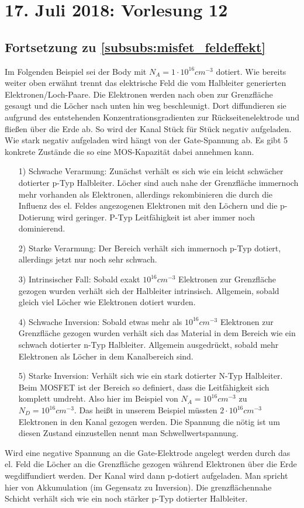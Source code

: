 \documentclass[12pt,a4paper]{report}%
\numberwithin{equation}{section}
\numberwithin{equation}{subsection}
\begin{document}
  \section{17. Juli 2018: Vorlesung 12}
  \subsection{Fortsetzung zu \ref{subsubs:misfet_feldeffekt}}
  Im Folgenden Beispiel sei der Body mit $N_A = 1\cdot 10^{16}cm^{-3}$ dotiert. Wie bereits weiter oben erwähnt trennt das elektrische Feld die vom Halbleiter generierten Elektronen/Loch-Paare. Die Elektronen werden nach oben zur Grenzfläche gesaugt und die Löcher nach unten hin weg beschleunigt. Dort diffundieren sie aufgrund des entstehenden Konzentrationsgradienten zur Rückseitenelektrode und fließen über die Erde ab. So wird der Kanal Stück für Stück negativ aufgeladen. Wie stark negativ aufgeladen wird hängt von der Gate-Spannung ab. Es gibt 5 konkrete Zustände die so eine MOS-Kapazität dabei annehmen kann.
  \begin{itemize}
    \item[1) ] Schwache Verarmung: Zunächst verhält es sich wie ein leicht schwächer dotierter p-Typ Halbleiter. Löcher sind auch nahe der Grenzfläche immernoch mehr vorhanden als Elektronen, allerdings rekombinieren die durch die Influenz des el. Feldes angezogenen Elektronen mit den Löchern und die p-Dotierung wird geringer. P-Typ Leitfähigkeit ist aber immer noch dominierend.
    \item[2) ] Starke Verarmung: Der Bereich verhält sich immernoch p-Typ dotiert, allerdings jetzt nur noch sehr schwach.
    \item[3) ] Intrinsischer Fall: Sobald exakt $10^{16}cm^{-3}$ Elektronen zur Grenzfläche gezogen wurden verhält sich der Halbleiter intrinsisch. Allgemein, sobald gleich viel Löcher wie Elektronen dotiert wurden.
    \item[4) ] Schwache Inversion: Sobald etwas mehr als $10^{16}cm^{-3}$ Elektronen zur Grenzfläche gezogen wurden verhält sich das Material in dem Bereich wie ein schwach dotierter n-Typ Halbleiter. Allgemein ausgedrückt, sobald mehr Elektronen als Löcher in dem Kanalbereich sind.
    \item[5) ] Starke Inversion: Verhält sich wie ein stark dotierter N-Typ Halbleiter. Beim MOSFET ist der Bereich so definiert, dass die Leitfähigkeit sich komplett umdreht. Also hier im Beispiel von $N_A = 10^{16}cm^{-3}$ zu $N_D = 10^{16}cm^{-3}$. Das heißt in unserem Beispiel müssten $2\cdot 10^{16}cm^{-3}$ Elektronen in den Kanal gezogen werden. Die Spannung die nötig ist um diesen Zustand einzustellen nennt man Schwellwertspannung.
  \end{itemize}
  Wird eine negative Spannung an die Gate-Elektrode angelegt werden durch das el. Feld die Löcher an die Grenzfläche gezogen während Elektronen über die Erde wegdiffundiert werden. Der Kanal wird dann p-dotiert aufgeladen. Man spricht hier von Akkumulation (im Gegensatz zu Inversion). Die grenzflächennahe Schicht verhält sich wie ein noch stärker p-Typ dotierter Halbleiter.
  
\end{document}
